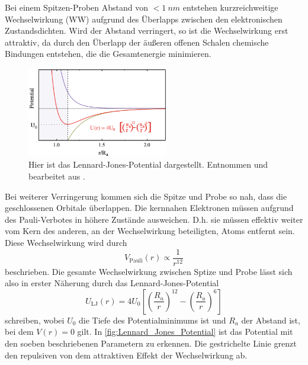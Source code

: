     Bei einem Spitzen-Proben Abstand von $< \SI{1}{nm}$ entstehen kurzreichweitige Wechselwirkung (WW) aufgrund des Überlapps zwischen den elektronischen Zustandsdichten.
    Wird der Abstand verringert, so ist die Wechselwirkung erst attraktiv, da durch den Überlapp der äußeren offenen Schalen chemische Bindungen entstehen, die die Gesamtenergie minimieren. \\
    \setlength{\columnsep}{15pt}
    \begin{figure}
        \centering{}
        \includegraphics[width=0.55\textwidth]{bilder/Lennard_Jones_Potential.png}
        \caption{Hier ist das Lennard-Jones-Potential dargestellt. Entnommen und bearbeitet aus \cite{voigtlaender}.} %
        \label{fig:Lennard_Jones_Potential}
    \end{figure}
    Bei weiterer Verringerung kommen sich die Spitze und Probe so nah, dass die geschlossenen Orbitale überlappen.
    Die kernnahen Elektronen müssen aufgrund des Pauli-Verbotes in höhere Zustände ausweichen.
    D.h. sie müssen effektiv weiter vom Kern des anderen, an der Wechselwirkung beteiligten, Atoms entfernt sein.
    Diese Wechselwirkung wird durch
    \begin{equation}
        V_{\mathrm{Pauli}}(r) \propto \frac{1}{r^{12}}
    \end{equation}
    beschrieben.
    Die gesamte Wechselwirkung zwischen Sptize und Probe lässt sich also in erster Näherung durch das Lennard-Jones-Potential
    \begin{equation}
        U_{\mathrm{LJ}}(r) = 4 U_0 \left[\left(\frac{R_a}{r}\right)^{12} - \left(\frac{R_a}{r}\right)^6\right]
        \label{eqn:Lennard_Jones_Potential}
    \end{equation}
    schreiben, wobei $U_0$ die Tiefe des Potentialminimums ist und $R_a$ der Abstand ist, bei dem $V(r) = 0$ gilt.
    In \autoref{fig:Lennard_Jones_Potential} ist das Potential mit den soeben beschriebenen Parametern zu erkennen.
    Die gestrichelte Linie grenzt den repulsiven von dem attraktiven Effekt der Wechselwirkung ab.

